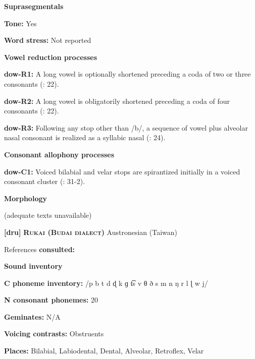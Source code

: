 \textbf{Suprasegmentals}



\textbf{Tone:} Yes



\textbf{Word stress:} Not reported



\textbf{Vowel reduction processes}



\textbf{dow-R1:} A long vowel is optionally shortened preceding a coda of two or three consonants (\citealt{WieringWiering1994}: 22).



\textbf{dow-R2:} A long vowel is obligatorily shortened preceding a coda of four consonants (\citealt{WieringWiering1994}: 22).



\textbf{dow-R3:} Following any stop other than /b/, a sequence of vowel plus alveolar nasal consonant is realized as a syllabic nasal (\citealt{WieringWiering1994}: 24).



\textbf{Consonant allophony processes}



\textbf{dow-C1:} Voiced bilabial and velar stops are spirantized initially in a voiced consonant cluster (\citealt{WieringWiering1994}: 31-2).



\textbf{Morphology}



(adequate texts unavailable)



\textbf{[dru]}   \textbf{\textsc{Rukai (Budai dialect)}  }Austronesian (Taiwan)



References \textbf{consulted:} \citet{Chen2006}



\textbf{Sound inventory}



\textbf{C phoneme inventory:} /p b t d ɖ k ɡ t͡s v θ ð s m n ŋ r l ɭ w j/



\textbf{N consonant phonemes:} 20



\textbf{Geminates:} N/A



\textbf{Voicing contrasts:} Obstruents



\textbf{Places:} Bilabial, Labiodental, Dental, Alveolar, Retroflex, Velar



